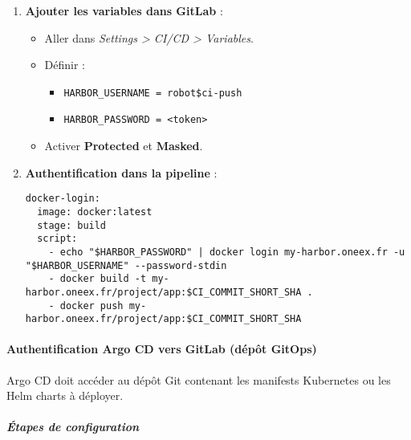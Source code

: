 \begin{enumerate}
	\item \textbf{Ajouter les variables dans GitLab} :
	      \begin{itemize}
		      \item Aller dans \emph{Settings > CI/CD > Variables}.
		      \item Définir :
		            \begin{itemize}
			            \item \texttt{HARBOR\_USERNAME = robot\$ci-push}
			            \item \texttt{HARBOR\_PASSWORD = <token>}
		            \end{itemize}
		      \item Activer \textbf{Protected} et \textbf{Masked}.
	      \end{itemize}


	\item \textbf{Authentification dans la pipeline} :

	      \begin{verbatim}
docker-login:
  image: docker:latest
  stage: build
  script:
    - echo "$HARBOR_PASSWORD" | docker login my-harbor.oneex.fr -u "$HARBOR_USERNAME" --password-stdin
    - docker build -t my-harbor.oneex.fr/project/app:$CI_COMMIT_SHORT_SHA .
    - docker push my-harbor.oneex.fr/project/app:$CI_COMMIT_SHORT_SHA
\end{verbatim}

\end{enumerate}

\paragraph{Authentification Argo CD vers GitLab (dépôt GitOps)}

Argo CD doit accéder au dépôt Git contenant les manifests Kubernetes ou les Helm charts à déployer.

\subparagraph{Étapes de configuration}

